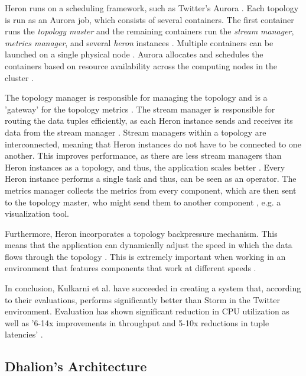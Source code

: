         \quad Heron runs on a scheduling framework, such as Twitter's Aurora \cite{dhalion}. 
        Each topology is run as an Aurora job, which consists of several containers. The first container runs the \textit{topology master} and the remaining containers run 
        the \textit{stream manager}, \textit{metrics manager}, and several \textit{heron} instances \cite[p. 242]{heron}.
        Multiple containers can be launched on a single physical node \cite[p. 242 f.]{heron}.
        Aurora allocates and schedules the containers based on resource availability across the computing nodes in the cluster \cite[p. 243]{heron}.

        \quad The topology manager is responsible for managing the topology and is a 'gateway' for the topology metrics \cite[p. 243]{heron}.
        The stream manager is responsible for routing the data tuples efficiently, as each Heron instance sends and receives its data from the stream manager \cite[p. 243]{heron}.
        Stream managers within a topology are interconnected, meaning that Heron instances do not have to be connected to one another.
        This improves performance, as there are less stream managers than Heron instances as a topology, and thus, the application scales better \cite[p. 243]{heron}.
        Every Heron instance performs a single task \cite[p. 245]{heron} and thus, can be seen as an operator.
        The metrics manager collects the metrics from every component, which are then sent to the topology master, who might send them to another component \cite[p. 243]{heron}, e.g. a visualization tool.

        \quad Furthermore, Heron incorporates a topology backpressure mechanism. This means that the application can dynamically adjust the speed in which the 
        data flows through the topology \cite[p. 243]{heron}. This is extremely important when working in an environment that features components that work at different speeds \cite[p. 243]{heron}.

        \quad In conclusion, Kulkarni et al. have succeeded in creating a system that, according to their evaluations, performs significantly better than Storm in the Twitter environment. 
        Evaluation has shown significant reduction in CPU utilization as well as '6-14x improvements in throughput and 5-10x reductions in tuple latencies' \cite[p. 249]{heron}.
        
        \subsection{Dhalion's Architecture}
        
